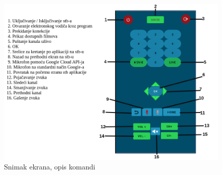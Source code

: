\documentclass[implementacija.tex]{subfiles}
\begin{document}
\begin{figure}[h!]
  \centering
  \includegraphics[width=\textwidth]{Implementacija/snimci_ekrana/komande_sa_opisom.png}
  \caption{Snimak ekrana, opis komandi}
   \label{fig:opis_komandi}
\end{figure}
\end{document}
